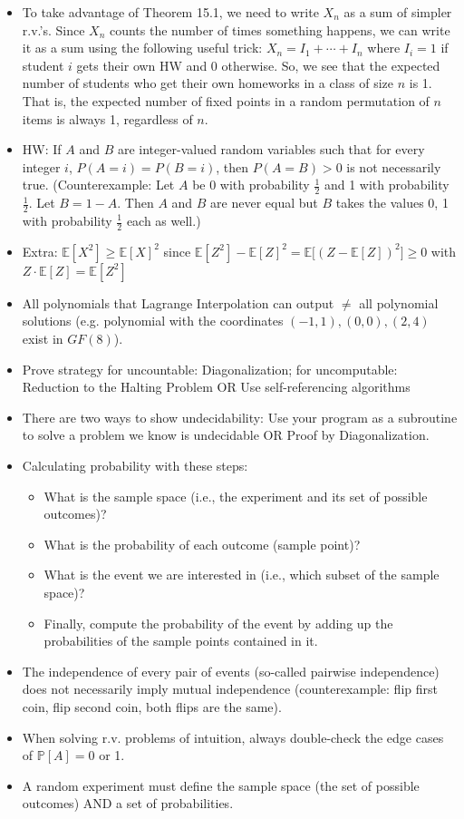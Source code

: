 \documentclass{article}
\begin{document}
\begin{itemize}
	\item To take advantage of Theorem 15.1, we need to write $X_n$ as a sum of simpler r.v.’s. Since $X_n$ counts the number of times something happens, we can write it as a sum using the following useful trick: $X_n = I_1 + \cdots + I_n$ where $I_i = 1$ if student $i$ gets their own HW and 0 otherwise. So, we see that the expected number of students who get their own homeworks in a class of size $n$ is 1. That is, the expected number of fixed points in a random permutation of $n$ items is always 1, regardless of $n$.
	\item HW: If $A$ and $B$ are integer-valued random variables such that for every integer $i$, $P(A = i) = P(B = i)$, then $P(A = B) > 0$ is not necessarily true. (Counterexample: Let $A$ be 0 with probability $\frac{1}{2}$ and 1 with probability $\frac{1}{2}$. Let $B = 1 - A$. Then $A$ and $B$ are never equal but $B$ takes the values 0, 1 with probability $\frac{1}{2}$ each as well.)
	\item Extra: $\mathbb{E}[X^2]\geq\mathbb{E}[X]^2$ since $\mathbb{E}[Z^2]-\mathbb{E}[Z]^2 = \mathbb{E}\big[(Z-\mathbb{E}[Z])^2\big]\geq0$ with $Z\cdot\mathbb{E}[Z] = \mathbb{E}[Z^2]$
\end{itemize}

\begin{itemize}
	\item All polynomials that Lagrange Interpolation can output $\neq$ all polynomial solutions (e.g. polynomial with the coordinates $(-1,1),(0,0),(2,4)$ exist in $GF(8)$).
	\item Prove strategy for uncountable: Diagonalization; for uncomputable: Reduction to the Halting Problem OR Use self-referencing algorithms
	\item There are two ways to show undecidability: Use your program as a subroutine to solve a problem we know is undecidable OR Proof by Diagonalization.
	\item Calculating probability with these steps:
	\begin{itemize}
		\item What is the sample space (i.e., the experiment and its set of possible outcomes)?
		\item What is the probability of each outcome (sample point)?
		\item What is the event we are interested in (i.e., which subset of the sample space)?
		\item Finally, compute the probability of the event by adding up the probabilities of the sample points contained in it.
	\end{itemize}
	\item The independence of every pair of events (so-called pairwise independence) does not necessarily imply mutual independence (counterexample: flip first coin, flip second coin, both flips are the same).
	\item When solving r.v. problems of intuition, always double-check the edge cases of $\mathbb{P}[A] = 0$ or 1.
	\item A random experiment must define the sample space (the set of possible outcomes) AND a set of probabilities.
\end{itemize}
\end{document}
